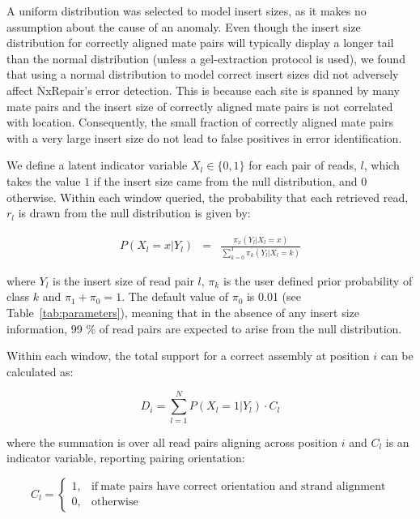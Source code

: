 \documentclass[fleqn,10pt]{wlpeerj}
\begin{document}
A uniform distribution was selected to model insert sizes, as it makes no assumption about the cause of an anomaly. Even though the insert size distribution for correctly aligned mate pairs will typically display a longer tail than the normal distribution (unless a gel-extraction protocol is used), we found that using a normal distribution to model correct insert sizes did not adversely affect NxRepair's error detection. This is because each site is spanned by many mate pairs and the insert size of correctly aligned mate pairs is not correlated with location. Consequently, the small fraction of correctly aligned mate pairs with a very large insert size do not lead to false positives in error identification. 

We define a latent indicator variable $X_l\in\{0,1\}$ for each pair of reads, $l$, which takes the value $1$ if the insert size came from the null distribution, and $0$ otherwise. Within each window queried, the probability that each retrieved read, $r_l$ is drawn from the null distribution is given by:

\begin{eqnarray} P(X_l=x|Y_l)& =& \frac{\pi_x(Y_l|X_l=x)}{\sum_{k=0}^1 \pi_k(Y_l|X_l=k)}
\label{eq:posterior}  
\end{eqnarray}

where $Y_l$ is the insert size of read pair $l$, $\pi_k$ is the user defined prior probability of class $k$ and $\pi_1 + \pi_0 = 1$. The default value of $\pi_0$ is 0.01 (see Table~\ref{tab:parameters}), meaning that in the absence of any insert size information, 99 \% of read pairs are expected to arise from the null distribution.  

Within each window, the total support for a correct assembly at position $i$ can be calculated as:

\begin{equation}
D_i = \sum_{l=1}^N P(X_l=1|Y_l)\cdot C_l
\end{equation}

where the summation is over all read pairs aligning across position $i$ and $C_l$ is an indicator variable, reporting pairing orientation:

\begin{equation}
    C_l=
    \begin{cases}
      1, & \text{if}\ \text{mate pairs have correct orientation and strand alignment} \\
      0, & \text{otherwise}
    \end{cases}
  \label{eq:C}
  \end{equation}
\end{document}
